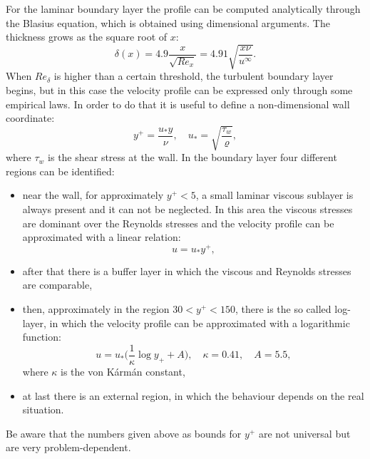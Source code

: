 For the laminar boundary layer the profile can be computed analytically 
through the Blasius equation, which is obtained using dimensional arguments. 
The thickness grows as the square root of $x$:
\begin{equation}
\delta(x) = 4.9 \frac{x}{\sqrt{Re_x}} = 4.91\sqrt{\frac{x 
		\nu}{u^\infty}}.
\end{equation}
When $Re_\delta$ is higher than a certain threshold, the turbulent boundary 
layer begins, but in this case the velocity profile can be expressed only 
through some empirical laws. In order to do that it is useful to define a 
non-dimensional wall coordinate:
\begin{equation}
y^+ = \frac{u_* y}{\nu}, \quad u_* = \sqrt{\frac{\tau_w}{\varrho}},
\end{equation}
where $\tau_w$ is the shear stress at the wall. In the boundary layer four 
different regions can be identified:
\begin{itemize}
	\item near the wall, for approximately $y^+ < 5$, a small laminar viscous 
	sublayer is 
	always present and it can not be neglected. In this area the viscous 
	stresses are dominant over the Reynolds stresses and the velocity profile 
	can be approximated with a linear relation:
	\begin{equation}
	u = u_* y^+,
	\end{equation}
	\item after that there is a buffer layer in which the viscous and Reynolds 
	stresses are comparable,
	\item then, approximately in the region $30 < y^+ < 150$, there is the so 
	called log-layer, in which the velocity profile can be approximated with a 
	logarithmic function:
	\begin{equation} \label{eq:loglaw}
	u = u_* \bigg( \frac{1}{\kappa} \log y_+ + A\bigg), \quad \kappa=0.41, 
	\quad A = 
	5.5,
	\end{equation}
	where $\kappa$ is the von K\'arm\'an constant,
	\item at last there is an external region, in which the behaviour depends 
	on 
	the real situation.	
\end{itemize}
Be aware that the numbers given above as bounds for $y^+$ are not universal but 
are very problem-dependent.
